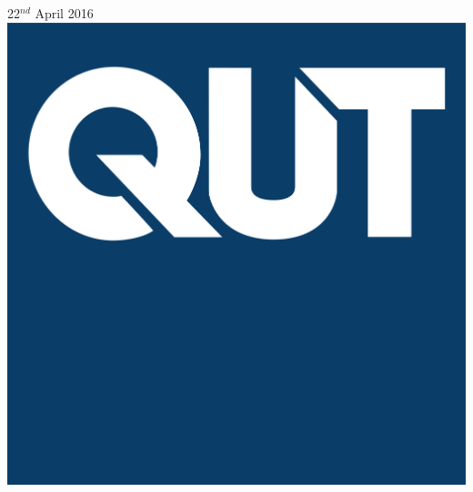 \documentclass[12pt]{article}
\begin{document}
\begin{titlepage}

{\large 22$^{nd}$ April 2016}\\[2cm] %


\includegraphics[scale=0.10]{qut-logo-better}\\[2cm] %
 


\end{titlepage}



\tableofcontents
\newpage
\end{document}
